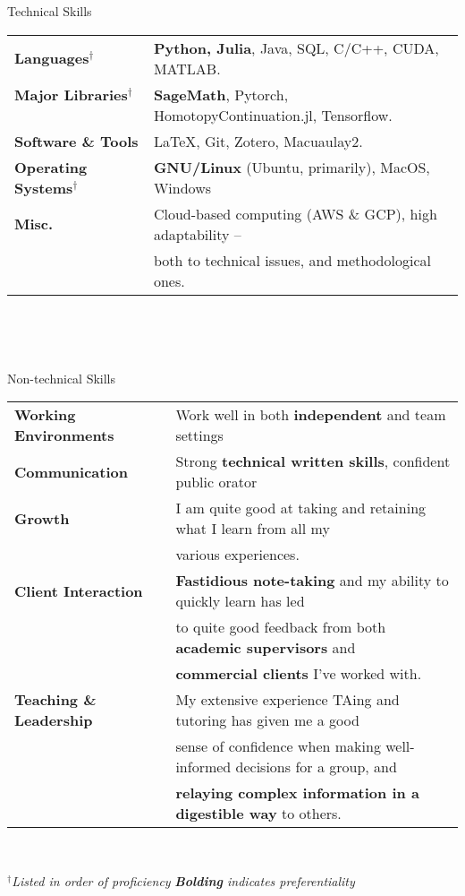 \begin{rSection}{Technical Skills}

\begin{tabular}{ @{} >{\bfseries}l @{\hspace{6ex}} l }

  						 
  Languages$^\dagger$  \ & \textbf{Python, Julia}, Java, SQL, C/C++, CUDA, MATLAB.
  \\Major Libraries$^\dagger$ \ & \textbf{SageMath}, Pytorch, HomotopyContinuation.jl, Tensorflow.
  \\Software \& Tools & \LaTeX, Git, Zotero, Macuaulay2.
  \\Operating Systems$^\dagger$ \ & \textbf{GNU/Linux} (Ubuntu, primarily), MacOS, Windows
  \\Misc. \ & Cloud-based computing (AWS \& GCP), high adaptability -- \\ & both to technical issues, and methodological ones.
  \end{tabular}\\

\end{rSection}

\

\begin{rSection}{Non-technical Skills}

\begin{tabular}{ @{} >{\bfseries}l @{\hspace{6ex}} l }

  Working Environments  \ & Work well in both \textbf{independent} and team settings \\
  Communication \ & Strong \textbf{technical written skills}, confident public orator \\
  Growth \ & I am quite good at taking and retaining what I learn from all my \\ & various experiences.
  \\
  Client Interaction \ & \textbf{Fastidious note-taking} and my ability to quickly learn has led \\ & to quite good feedback from both \textbf{academic supervisors} and \\ & \textbf{commercial clients} I've worked with.
  \\Teaching \& Leadership \ & My extensive experience TAing and tutoring has given me a good \\ & sense of confidence when making well-informed decisions for a group, and \\ & \textbf{relaying complex information in a digestible way} to others.
\end{tabular}\\

\end{rSection}

\smallskip
\emph{$^\dagger$Listed in order of proficiency} \hfill
\emph{\textbf{Bolding} indicates preferentiality}